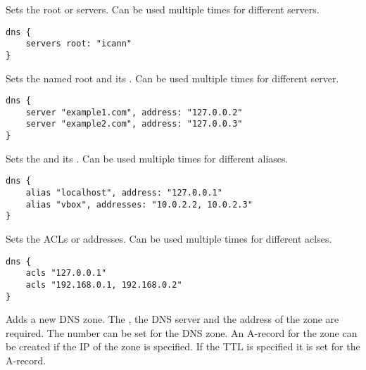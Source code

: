 
Sets the root  or servers. Can be used multiple times
for different servers.

\begin{lstlisting}[style=Java]
dns {
    servers root: "icann"
}
\end{lstlisting}


Sets the named root  and its . Can be used multiple times
for different server.

\begin{lstlisting}[style=Java]
dns {
    server "example1.com", address: "127.0.0.2"
    server "example2.com", address: "127.0.0.3"
}
\end{lstlisting}


Sets the  and its . Can be used multiple times
for different aliases.

\begin{lstlisting}[style=Java]
dns {
    alias "localhost", address: "127.0.0.1"
    alias "vbox", addresses: "10.0.2.2, 10.0.2.3"
}
\end{lstlisting}


Sets the ACLs  or addresses. Can be used multiple times
for different aclses.

\begin{lstlisting}[style=Java]
dns {
    acls "127.0.0.1"
    acls "192.168.0.1, 192.168.0.2"
}
\end{lstlisting}


Adds a new DNS zone. The , the  DNS server and 
the  address of the zone are required. The  number can
be set for the DNS zone.
An A-record for the zone
can be created if the IP  of the zone is specified. If the
TTL  is specified it is set for the A-record.

